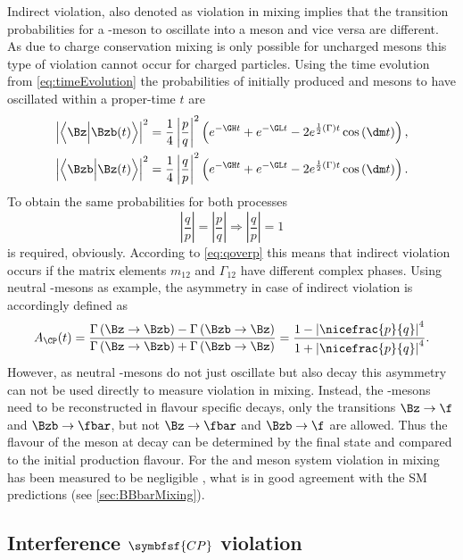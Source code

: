 Indirect \CP violation, also denoted as \CP violation in mixing implies that the transition probabilities for a \Bz-meson to oscillate into a \Bzb meson and vice versa are different.
As due to charge conservation mixing is only possible for uncharged mesons this type of \CP violation cannot occur for charged particles.
Using the time evolution from \cref{eq:timeEvolution} the probabilities of \eg initially produced \Bz and \Bzb mesons to have oscillated within a proper-time $t$ are
\begin{align}
\left|\left<\Bz\Big|\Bzb\!\left(t\right)\right>\right|^2=\frac{1}{4}\left|\frac{p}{q}\right|^2
\left(e^{-\GH t}+e^{-\GL t}-2e^{\frac{1}{2}\left(\Gamma\right)t}\cos\left(\dm t\right)\right),\\
\left|\left<\Bzb\Big|\Bz\!\left(t\right)\right>\right|^2=\frac{1}{4}\left|\frac{q}{p}\right|^2
\left(e^{-\GH t}+e^{-\GL t}-2e^{\frac{1}{2}\left(\Gamma\right)t}\cos\left(\dm t\right)\right).
\end{align}
To obtain the same probabilities for both processes
\begin{equation}
\left|\frac{q}{p}\right|=\left|\frac{p}{q}\right| \Rightarrow \left|\frac{q}{p}\right|=1
\end{equation}
is required, obviously.
According to \cref{eq:qoverp} this means that indirect \CP violation occurs if the matrix elements $m_{12}$ and $\Gamma_{12}$ have different complex phases.
Using neutral \B-mesons as example, the \CP asymmetry in case of indirect \CP violation is accordingly defined as
\begin{equation}
A_{\CP}(t)=\frac{\Gamma\left(\Bz\to\Bzb\right) - \Gamma\left(\Bzb\to\Bz\right)}{\Gamma\left(\Bz\to\Bzb\right) + \Gamma\left(\Bzb\to\Bz\right)}
= \frac{1-\left|\nicefrac{p}{q}\right|^4}{1+\left|\nicefrac{p}{q}\right|^4}.
\end{equation}
However, as neutral \B-mesons do not just oscillate but also decay this asymmetry can not be used directly to measure \CP violation in mixing.
Instead, the \B-mesons need to be reconstructed in flavour specific decays, \ie only the transitions $\Bz\to\f$ and $\Bzb\to\fbar$, but not $\Bz\to\fbar$ and $\Bzb\to\f$ are allowed.
Thus the flavour of the meson at decay can be determined by the final state and compared to the initial production flavour.
For the \Bz and \Bs meson system \CP violation in mixing has been measured to be negligible \cite{HFLAV2016}, what is in good agreement with the \ac{SM} predictions (see \cref{sec:BBbarMixing}).

\subsection[head={Interference \CP violation},tocentry={Interference \CP violation}]{Interference $\symbfsf{C{}P}$ violation}
\label{sec:InterferenceCPV}

